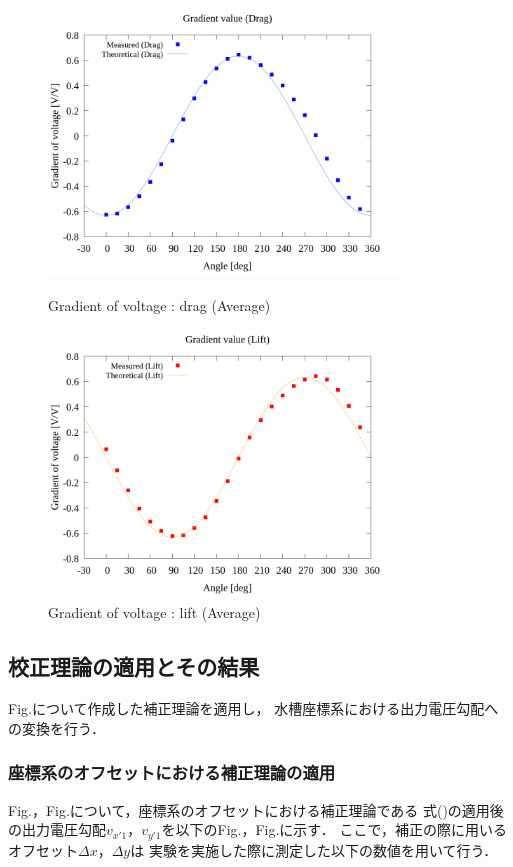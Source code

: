 \begin{figure}[htbp]
		\centering
		\includegraphics[width=95mm]{../../02_workspace/result/2-ex/plot/21/21-1_summary_drag.png}
		\caption{Gradient of voltage : drag (Average)}
		\includegraphics[width=95mm]{../../02_workspace/result/2-ex/plot/21/21-1_summary_lift.png}
		\caption{Gradient of voltage : lift (Average)}
\end{figure}

\newpage

\subsection{校正理論の適用とその結果}
Fig.について作成した補正理論を適用し，
水槽座標系における出力電圧勾配への変換を行う．

\subsubsection{座標系のオフセットにおける補正理論の適用}
Fig.，Fig.について，座標系のオフセットにおける補正理論である
式()の適用後の出力電圧勾配$v_{x'1}$，$v_{y'1}$を以下のFig.，Fig.に示す．
ここで，補正の際に用いるオフセット$\Delta x$，$\Delta y$は
実験を実施した際に測定した以下の数値を用いて行う．

